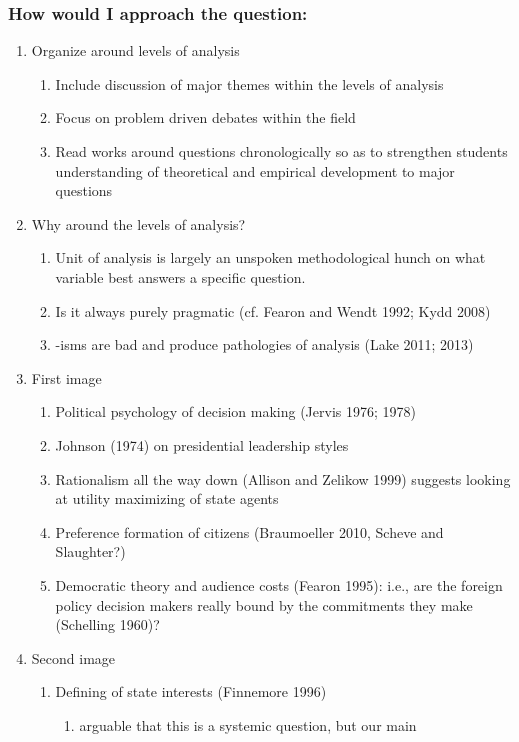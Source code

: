 \documentclass[11pt]{article}
\begin{document}
\subsubsection{How would I approach the question:}
\label{sec-5-2-1}
\begin{enumerate}
\item Organize around levels of analysis
\begin{enumerate}
\item Include discussion of major themes within the levels of analysis
\item Focus on problem driven debates within the field
\item Read works around questions chronologically so as to strengthen
students understanding of theoretical and empirical development
to major questions
\end{enumerate}
\item Why around the levels of analysis?
\begin{enumerate}
\item Unit of analysis is largely an unspoken methodological hunch on
what variable best answers a specific question.
\item Is it always purely pragmatic (cf. Fearon and Wendt 1992; Kydd 2008)
\item -isms are bad and produce pathologies of analysis (Lake 2011; 2013)
\end{enumerate}
\item First image
\begin{enumerate}
\item Political psychology of decision making (Jervis 1976; 1978)
\item Johnson (1974) on presidential leadership styles
\item Rationalism all the way down (Allison and Zelikow 1999) suggests
looking at utility maximizing of state agents
\item Preference formation of citizens (Braumoeller 2010, Scheve and Slaughter?)
\item Democratic theory and audience costs (Fearon 1995): i.e., are
the foreign policy decision makers really bound by the
commitments they make (Schelling 1960)?
\end{enumerate}
\item Second image
\begin{enumerate}
\item Defining of state interests (Finnemore 1996)
\begin{enumerate}
\item arguable that this is a systemic question, but our main

\end{enumerate}
\end{enumerate}
\end{enumerate}
\end{document}
